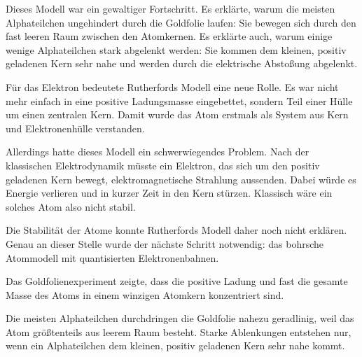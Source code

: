 Dieses Modell war ein gewaltiger Fortschritt. Es erklärte, warum die meisten
Alphateilchen ungehindert durch die Goldfolie laufen: Sie bewegen sich durch
den fast leeren Raum zwischen den Atomkernen. Es erklärte auch, warum einige
wenige Alphateilchen stark abgelenkt werden: Sie kommen dem kleinen, positiv
geladenen Kern sehr nahe und werden durch die elektrische Abstoßung abgelenkt.

Für das Elektron bedeutete Rutherfords Modell eine neue Rolle. Es war nicht mehr
einfach in eine positive Ladungsmasse eingebettet, sondern Teil einer Hülle um
einen zentralen Kern. Damit wurde das Atom erstmals als System aus Kern und
Elektronenhülle verstanden.

Allerdings hatte dieses Modell ein schwerwiegendes Problem. Nach der klassischen
Elektrodynamik müsste ein Elektron, das sich um den positiv geladenen Kern
bewegt, elektromagnetische Strahlung aussenden. Dabei würde es Energie verlieren
und in kurzer Zeit in den Kern stürzen. Klassisch wäre ein solches Atom also
nicht stabil.

Die Stabilität der Atome konnte Rutherfords Modell daher noch nicht erklären.
Genau an dieser Stelle wurde der nächste Schritt notwendig: das bohrsche
Atommodell mit quantisierten Elektronenbahnen.

\begin{PhysicsBox}
	
	\label{box:rutherford-kernaussage}
	Das Goldfolienexperiment zeigte, dass die positive Ladung und fast die gesamte
	Masse des Atoms in einem winzigen Atomkern konzentriert sind.
	
	Die meisten Alphateilchen durchdringen die Goldfolie nahezu geradlinig, weil
	das Atom größtenteils aus leerem Raum besteht. Starke Ablenkungen entstehen nur,
	wenn ein Alphateilchen dem kleinen, positiv geladenen Kern sehr nahe kommt.
	
\end{PhysicsBox}